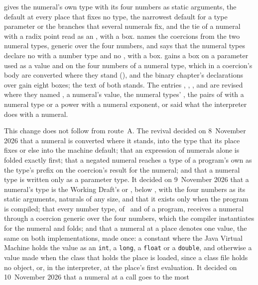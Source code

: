 \begin{description}
 gives the numeral's own type with its four numbers as
static arguments, the default at every place that fixes no type, the narrowest
default for a type parameter or the branches that several numerals fix, and the
tie of a numeral with a radix point read as an , with a box.
 names the coercions from the two numeral types, generic
over the four numbers, and says that the numeral types declare no \EXP{=} with a
number type and no , with a box.
 gains a box on a  parameter used as a value and on
the four numbers of a numeral type, which in a coercion's body are converted
where they stand (), and the binary chapter's declarations over
 gain eight boxes; the text of both stands.
The entries , ,
,  and
 are revised where they named , a
numeral's value, the numeral types' , the pairs of \EXP{=} with
a numeral type or a power with a numeral exponent, or said what the interpreter
does with a numeral.
\item[Rationale] This change does not follow from route~A.
The revival decided on 8~November 2026 that a numeral is converted where it
stands, into the type that its place fixes or else into the machine default;
that an expression of numerals alone is folded exactly first; that a negated
numeral reaches a type of a program's own as the type's prefix \EXP{-} on the
coercion's result for the numeral; and that a numeral type is written only as a
parameter type.
It decided on 9~November 2026 that a numeral's type is the Working Draft's
 or , below , with the
four numbers as its static arguments, naturals of any size, and that it exists
only when the program is compiled; that every number type, of \library\ and of a
program, receives a numeral through a coercion generic over the four numbers,
which the compiler instantiates for the numeral and folds; and that a numeral at
a place denotes one value, the same on both implementations, made once: a
constant where the Java Virtual Machine holds the value as an \texttt{int}, a
\texttt{long}, a \texttt{float} or a \texttt{double}, and otherwise a value made
when the class that holds the place is loaded, since a class file holds no
object, or, in the interpreter, at the place's first evaluation.
It decided on 10~November 2026 that a numeral at a call goes to the most

\end{description}
